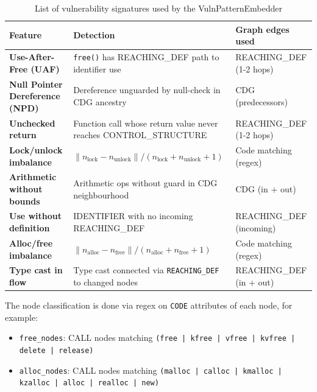 \begin{itemize}
    \begin{table}[h]
    \caption[Semantic+Structure vuln list]{List of vulnerability signatures used by the VulnPatternEmbedder}\label{tab:pattern_vuln_feature}
        \centering
        \begin{tabularx}{\textwidth}{l X X}
            \hline
            \textbf{Feature} & \textbf{Detection} & \textbf{Graph edges used} \\
            \hline
            \textbf{Use-After-Free (UAF)} & \texttt{free()} has REACHING\_DEF path to identifier use & REACHING\_DEF (1-2 hops) \\
            \hline
            \textbf{Null Pointer Dereference (NPD)} & Dereference unguarded by null-check in CDG ancestry & CDG (predecessors) \\
            \hline
            \textbf{Unchecked return} & Function call whose return value never reaches CONTROL\_STRUCTURE & REACHING\_DEF (1-2 hops) \\
            \hline
            \textbf{Lock/unlock imbalance} & $\|n_\text{lock} - n_\text{unlock}\| / (n_\text{lock} + n_\text{unlock} + 1)$ & Code matching (regex) \\
            \hline
            \textbf{Arithmetic without bounds} & Arithmetic ops without guard in CDG neighbourhood & CDG (in + out) \\
            \hline
            \textbf{Use without definition} & IDENTIFIER with no incoming REACHING\_DEF & REACHING\_DEF (incoming) \\
            \hline
            \textbf{Alloc/free imbalance} & $\|n_\text{alloc} - n_\text{free}\| / (n_\text{alloc} + n_\text{free} + 1)$ & Code matching (regex) \\
            \hline
            \textbf{Type cast in flow} & Type cast connected via \texttt{REACHING\_DEF} to changed nodes & REACHING\_DEF (in + out) \\
            \hline
        \end{tabularx}
    \end{table}
    The node classification is done via regex on \texttt{CODE} attributes of each node, for example:
    \begin{itemize}
        \item \texttt{free\_nodes}: CALL nodes matching \texttt{(free | kfree | vfree | kvfree | delete | release)}
        \item \texttt{alloc\_nodes}: CALL nodes matching \texttt{(malloc | calloc | kmalloc | kzalloc | alloc | realloc | new)}

\end{itemize}
\end{itemize}
